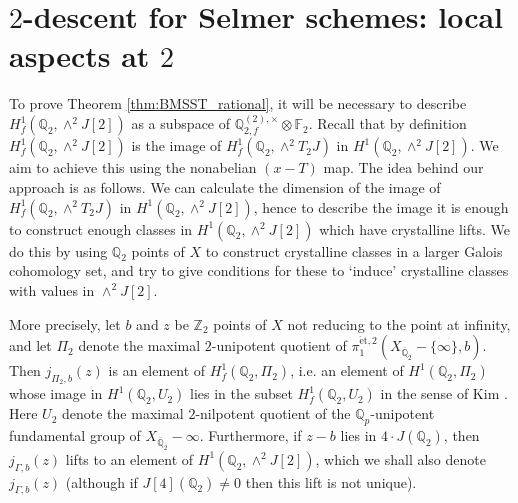 \documentclass[11pt]{amsart}
\def\Z{\mathbb Z}
\def\Q{\mathbb Q}
\def\F{\mathbb F}
\theoremstyle{plain}
\theoremstyle{definition}
\newcommand{\et}{\mathrm{\acute{e}t}}
\begin{document}
\section{$2$-descent for Selmer schemes: local aspects at $2$}\label{sec:2}

To prove Theorem \ref{thm:BMSST_rational}, it will be necessary to describe $H^1 _f (\Q _2 ,\wedge ^2 J[2])$ as a subspace of $\Q _{2,f}^{(2),\times }\otimes \F _2 $. Recall that by definition $H^1 _f (\Q _2 ,\wedge ^2 J[2])$ is the image of $H^1 _f (\Q _2 ,\wedge ^2 T_2 J)$ in $H^1 (\Q _2 ,\wedge ^2 J[2])$. We aim to achieve this using the nonabelian $(x-T)$ map. The idea behind our approach is as follows. We can calculate the dimension of the image of $H^1 _f (\Q _2 ,\wedge ^2 T_2 J)$ in $H^1 (\Q _2 ,\wedge ^2 J[2])$, hence to describe the image it is enough to construct enough classes in $H^1 (\Q _2 ,\wedge ^2 J[2])$ which have crystalline lifts. We do this by using $\Q _2 $ points of $X$ to construct crystalline classes in a larger Galois cohomology set, and try to give conditions for these to `induce' crystalline classes with values in $\wedge ^2 J[2]$.

More precisely, let $b$ and $z$ be $\Z _2 $ points of $X$ not reducing to the point at infinity, and let $\Pi _2 $ denote the maximal $2$-unipotent quotient of $\pi _1 ^{\et ,2}(X_{\overline{\Q }_2 }-\{ \infty \} ,b)$. Then $j_{\Pi _2 ,b}(z)$ is an element of $H^1 _f (\Q _2 ,\Pi _2 )$, i.e. an element of $H^1 (\Q _2 ,\Pi _2 )$ whose image in $H^1 (\Q _2 ,U_2 )$ lies in the subset $H^1 _f (\Q _2 ,U_2 )$ in the sense of Kim \cite{kim:chabauty}. Here $U_2$ denote the maximal $2$-nilpotent quotient of the $\Q _p $-unipotent fundamental group of $X_{\overline{\Q }_2 }-\infty $. Furthermore, if $z-b$ lies in $4\cdot J(\Q _2 )$, then $j_{\Gamma ,b}(z)$ lifts to an element of $H^1 (\Q _2 ,\wedge ^2 J[2])$, which we shall also denote $j_{\Gamma ,b}(z)$ (although if $J[4](\Q _2 )\neq 0$ then this lift is not unique).
\end{document}
